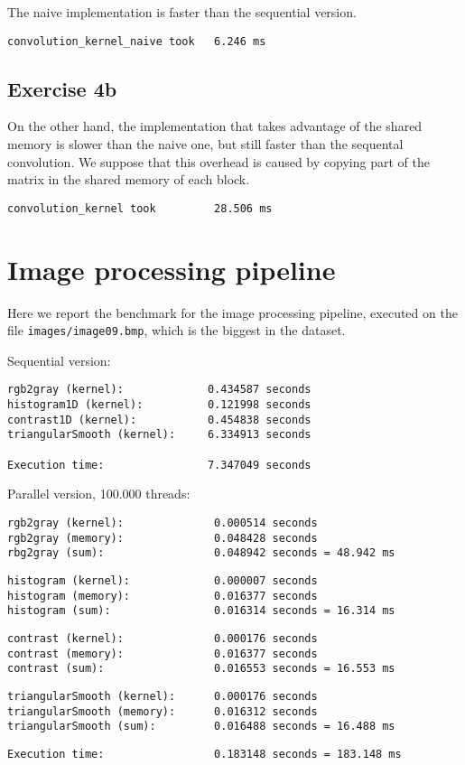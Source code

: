 \documentclass[a4paper]{article}
\begin{document}
The naive implementation is faster than the sequential version.

\begin{verbatim}
convolution_kernel_naive took   6.246 ms
\end{verbatim}

\subsection{Exercise 4b}

On the other hand, the implementation that takes advantage of the shared memory is slower than the naive one, but still faster than the sequental convolution. We suppose that this overhead is caused by copying part of the matrix in the shared memory of each block.

\begin{verbatim}
convolution_kernel took         28.506 ms
\end{verbatim}

\section{Image processing pipeline}

Here we report the benchmark for the image processing pipeline, executed on the file \texttt{images/image09.bmp}, which is the biggest in the dataset.


\noindent Sequential version:

\begin{verbatim}
rgb2gray (kernel):             0.434587 seconds
histogram1D (kernel):          0.121998 seconds
contrast1D (kernel):           0.454838 seconds
triangularSmooth (kernel):     6.334913 seconds

Execution time:                7.347049 seconds
\end{verbatim}

\noindent Parallel version, 100.000 threads:

\begin{verbatim}
rgb2gray (kernel):              0.000514 seconds
rgb2gray (memory):              0.048428 seconds
rbg2gray (sum):                 0.048942 seconds = 48.942 ms
\end{verbatim}
\begin{verbatim}
histogram (kernel):             0.000007 seconds
histogram (memory):             0.016377 seconds
histogram (sum):                0.016314 seconds = 16.314 ms
\end{verbatim}
\begin{verbatim}
contrast (kernel):              0.000176 seconds
contrast (memory):              0.016377 seconds
contrast (sum):                 0.016553 seconds = 16.553 ms
\end{verbatim}
\begin{verbatim}
triangularSmooth (kernel):      0.000176 seconds
triangularSmooth (memory):      0.016312 seconds
triangularSmooth (sum):         0.016488 seconds = 16.488 ms
\end{verbatim}
\begin{verbatim}
Execution time:                 0.183148 seconds = 183.148 ms 		
\end{verbatim}
\end{document}
